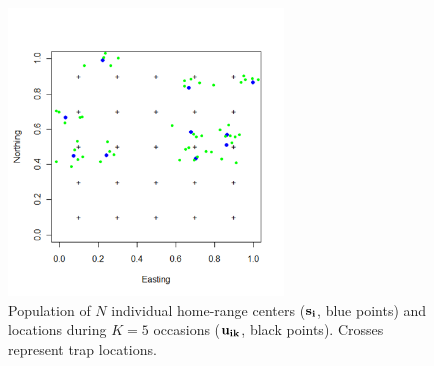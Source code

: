 \begin{figure}
\begin{center}
\includegraphics[height=3in]{Ch1/figs/northingeasting}
\end{center}
\caption{Population of $N$ individual home-range centers ($\bf s_i$,
  blue points) and locations during $K=5$ occasions ($\bf u_{ik}$,
  black points). Crosses represent trap locations.}
\label{intro.fig.fig1}
\end{figure}



